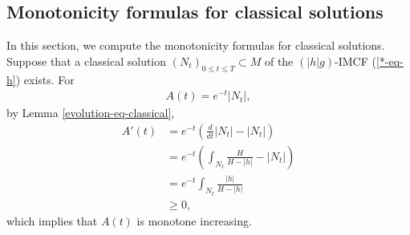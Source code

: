 \documentclass[11pt, letterpaper]{amsart}
\theoremstyle{definition}
\theoremstyle{remark}
\begin{document}
\subsection{Monotonicity formulas for classical solutions}\label{sect-monotone-classical}
In this section, we compute the monotonicity formulas for classical solutions.
Suppose that a classical solution $(N_{t})_{0 \leq t \leq T} \subset M$ of the $(|h|g)$-IMCF (\ref{*-eq-h}) exists. For 
\begin{align*}
	A(t) = e ^{-t}|N_t|,
\end{align*} 
by Lemma \ref{evolution-eq-classical}, 
\begin{align*}
	A'(t) &= e ^{-t} \left( \frac{d}{d t}|N_t| - |N_t| \right)\\
	      &= e ^{-t} \left( \int_{N_t} \frac{H}{H - |h|} - |N_t| \right) \\
	      &= e ^{-t} \int_{N_t} \frac{|h|}{H - |h|}\\
	      & \geq 0,
\end{align*} 
which implies that $A(t)$ is monotone increasing. 
\end{document}
